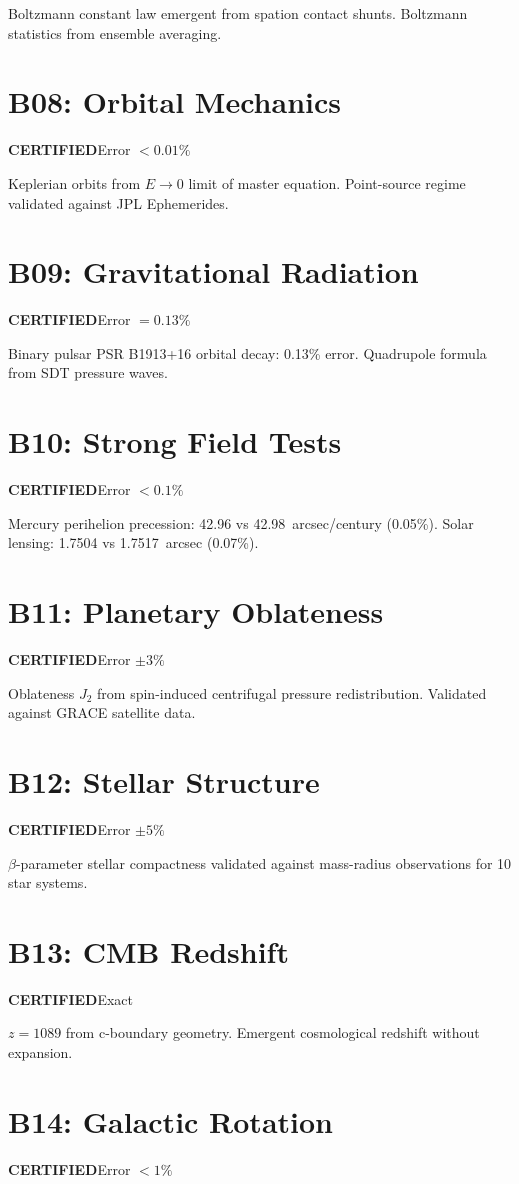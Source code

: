 \documentclass[12pt,a4paper]{report}
\newcommand{\PASS}{\textcolor{pass}{\textbf{CERTIFIED}}}
\begin{document}
Boltzmann constant law emergent from spation contact shunts. Boltzmann statistics from ensemble averaging.

\section{B08: Orbital Mechanics}
\PASS\quad Error $<0.01\%$

Keplerian orbits from $E \to 0$ limit of master equation. Point-source regime validated against JPL Ephemerides.

\section{B09: Gravitational Radiation}
\PASS\quad Error $= 0.13\%$

Binary pulsar PSR B1913+16 orbital decay: 0.13\% error. Quadrupole formula from SDT pressure waves.

\section{B10: Strong Field Tests}
\PASS\quad Error $<0.1\%$

Mercury perihelion precession: 42.96 vs 42.98~arcsec/century (0.05\%). Solar lensing: 1.7504 vs 1.7517~arcsec (0.07\%).

\section{B11: Planetary Oblateness}
\PASS\quad Error $\pm 3\%$

Oblateness $J_2$ from spin-induced centrifugal pressure redistribution. Validated against GRACE satellite data.

\section{B12: Stellar Structure}
\PASS\quad Error $\pm 5\%$

$\beta$-parameter stellar compactness validated against mass-radius observations for 10 star systems.

\section{B13: CMB Redshift}
\PASS\quad Exact

$z = 1089$ from c-boundary geometry. Emergent cosmological redshift without expansion.

\section{B14: Galactic Rotation}
\PASS\quad Error $<1\%$
\end{document}

